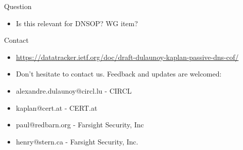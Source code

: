 \begin{frame}[t]{Question}
\begin{center}
\begin{itemize}
\item Is this relevant for DNSOP? WG item?
\end{itemize}
\end{center}
\end{frame}

\begin{frame}[t]{Contact}
\begin{itemize}
\item \url{https://datatracker.ietf.org/doc/draft-dulaunoy-kaplan-passive-dns-cof/}
\item Don't hesitate to contact us. Feedback and updates are welcomed:
\item alexandre.dulaunoy@circl.lu - CIRCL
\item kaplan@cert.at - CERT.at
\item paul@redbarn.org - Farsight Security, Inc
\item henry@stern.ca - Farsight Security, Inc.
\end{itemize}
\end{frame}



